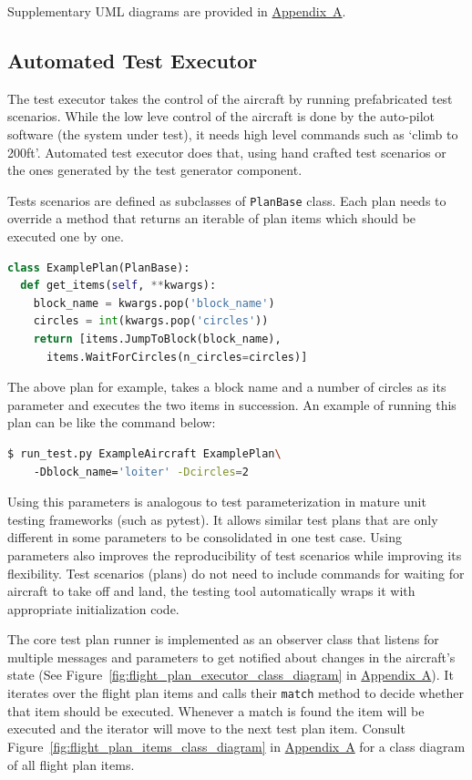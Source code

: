 Supplementary UML diagrams are provided in \hyperref[appendixa]{Appendix~A}.


\subsection{Automated Test Executor}
The test executor takes the control of the aircraft by running prefabricated test scenarios. While the low leve control of the aircraft is done by the auto-pilot software (the system under test), it needs high level commands such as `climb to 200ft'. Automated test executor does that, using hand crafted test scenarios or the ones generated by the test generator component.

Tests scenarios are defined as subclasses of \verb|PlanBase| class. Each plan needs to override a method that returns an iterable of plan items which should be executed one by one. 
\begin{lstlisting}[language=Python, basicstyle=\linespread{0.1}]
class ExamplePlan(PlanBase):
  def get_items(self, **kwargs):
    block_name = kwargs.pop('block_name')
    circles = int(kwargs.pop('circles'))
    return [items.JumpToBlock(block_name),
      items.WaitForCircles(n_circles=circles)]
\end{lstlisting}
The above plan for example, takes a block name and a number of circles as its parameter and executes the two items in succession. An example of running this plan can be like the command below:
\begin{lstlisting}[language=bash]
$ run_test.py ExampleAircraft ExamplePlan\ 
    -Dblock_name='loiter' -Dcircles=2
\end{lstlisting}
Using this parameters is analogous to test parameterization in mature unit testing frameworks (such as pytest). It allows similar test plans that are only different in some parameters to be consolidated in one test case.
Using parameters also improves the reproducibility of test scenarios while improving its flexibility. Test scenarios (plans) do not need to include commands for waiting for aircraft to take off and land, the testing tool automatically wraps it with appropriate initialization code.

The core test plan runner is implemented as an observer class that listens for multiple messages and parameters to get notified about changes in the aircraft's state (See Figure~\ref{fig:flight_plan_executor_class_diagram} in \hyperref[appendixa]{Appendix~A}). It iterates over the flight plan items and calls their \verb|match| method to decide whether that item should be executed. Whenever a match is found the item will be executed and the iterator will move to the next test plan item. Consult Figure~\ref{fig:flight_plan_items_class_diagram} in \hyperref[appendixa]{Appendix~A} for a class diagram of all flight plan items.

